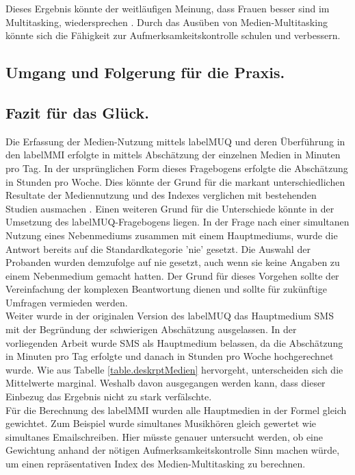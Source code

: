 Dieses Ergebnis könnte der weitläufigen Meinung, dass Frauen besser sind im Multitasking, wiedersprechen \cite{Oconnell2002}. Durch das Ausüben von Medien-Multitasking könnte sich die Fähigkeit zur Aufmerksamkeitskontrolle schulen und verbessern.
\subsection{Umgang und Folgerung für die Praxis.}
\par
\subsection{Fazit für das Glück.}


\label{section.diskussion.methodenkritik}
Die Erfassung der Medien-Nutzung mittels \gls{labelMUQ} und deren Überführung in den \gls{labelMMI} erfolgte in mittels Abschätzung der einzelnen Medien in Minuten pro Tag. In der ursprünglichen Form dieses Fragebogens erfolgte die Abschätzung in Stunden pro Woche. Dies könnte der Grund für die markant unterschiedlichen Resultate der Mediennutzung und des Indexes verglichen mit bestehenden Studien ausmachen \cite{Ophir2009,Alzahabi2013}. Einen weiteren Grund für die Unterschiede könnte in der Umsetzung des \gls{labelMUQ}-Fragebogens liegen. In der Frage nach einer simultanen Nutzung eines Nebenmediums zusammen mit einem Hauptmediums, wurde die Antwort bereits auf die Standardkategorie 'nie' gesetzt. Die Auswahl der Probanden wurden demzufolge auf nie gesetzt, auch wenn sie keine Angaben zu einem Nebenmedium gemacht hatten. Der Grund für dieses Vorgehen sollte der Vereinfachung der komplexen Beantwortung dienen und sollte für zukünftige Umfragen vermieden werden.\\
Weiter wurde in der originalen Version des \gls{labelMUQ} das Hauptmedium SMS mit der Begründung der schwierigen Abschätzung ausgelassen. In der vorliegenden Arbeit wurde SMS als Hauptmedium belassen, da die Abschätzung in Minuten pro Tag erfolgte und danach in Stunden pro Woche hochgerechnet wurde.  Wie aus Tabelle \ref{table.deskrptMedien} hervorgeht, unterscheiden sich die Mittelwerte marginal. Weshalb davon ausgegangen werden kann, dass dieser Einbezug das Ergebnis nicht zu stark verfälschte.\\
Für die Berechnung des \gls{labelMMI} wurden alle Hauptmedien in der Formel gleich gewichtet. Zum Beispiel wurde simultanes Musikhören gleich gewertet wie simultanes Emailschreiben. Hier müsste genauer untersucht werden, ob eine Gewichtung anhand der nötigen Aufmerksamkeitskontrolle Sinn machen würde, um einen repräsentativen Index des Medien-Multitasking zu berechnen.\\
